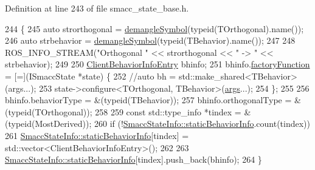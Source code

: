 Definition at line 243 of file smacc\+\_\+state\+\_\+base.\+h.


\begin{DoxyCode}
244   \{
245     \textcolor{keyword}{auto} strorthogonal = \hyperlink{namespacesmacc_1_1introspection_a2f495108db3e57604d8d3ff5ef030302}{demangleSymbol}(\textcolor{keyword}{typeid}(TOrthogonal).name());
246     \textcolor{keyword}{auto} strbehavior = \hyperlink{namespacesmacc_1_1introspection_a2f495108db3e57604d8d3ff5ef030302}{demangleSymbol}(\textcolor{keyword}{typeid}(TBehavior).name());
247 
248     ROS\_INFO\_STREAM(\textcolor{stringliteral}{"Orthogonal "} << strorthogonal << \textcolor{stringliteral}{" -> "} << strbehavior);
249 
250     \hyperlink{structsmacc_1_1introspection_1_1ClientBehaviorInfoEntry}{ClientBehaviorInfoEntry} bhinfo;
251     bhinfo.\hyperlink{structsmacc_1_1introspection_1_1ClientBehaviorInfoEntry_abb0863623802e0107c659e61931518f4}{factoryFunction} = [=](ISmaccState *state) \{
252       \textcolor{comment}{//auto bh = std::make\_shared<TBehavior>(args...);}
253       state->configure<TOrthogonal, TBehavior>(\hyperlink{namespacegenerate__debs_a75f9143e38df82d83b2e8a6f99cae02c}{args}...);
254     \};
255 
256     bhinfo.behaviorType = &(\textcolor{keyword}{typeid}(TBehavior));
257     bhinfo.orthogonalType = &(\textcolor{keyword}{typeid}(TOrthogonal));
258 
259     \textcolor{keyword}{const} std::type\_info *tindex = &(\textcolor{keyword}{typeid}(MostDerived));
260     \textcolor{keywordflow}{if} (!\hyperlink{classsmacc_1_1introspection_1_1SmaccStateInfo_ad3d8b3450060cb0b91f38fb2fe0a7678}{SmaccStateInfo::staticBehaviorInfo}.count(tindex))
261       \hyperlink{classsmacc_1_1introspection_1_1SmaccStateInfo_ad3d8b3450060cb0b91f38fb2fe0a7678}{SmaccStateInfo::staticBehaviorInfo}[tindex] = 
      std::vector<ClientBehaviorInfoEntry>();
262 
263     \hyperlink{classsmacc_1_1introspection_1_1SmaccStateInfo_ad3d8b3450060cb0b91f38fb2fe0a7678}{SmaccStateInfo::staticBehaviorInfo}[tindex].push\_back(bhinfo);
264   \}
\end{DoxyCode}
